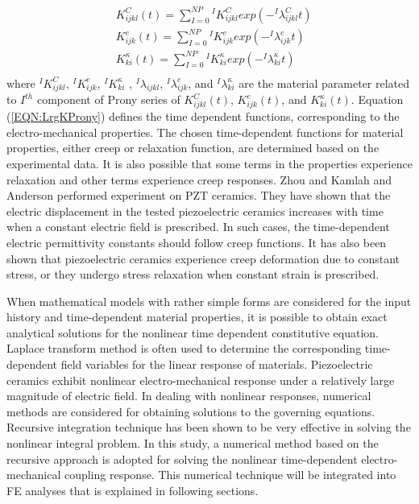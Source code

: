 \begin{equation}
\label{EQN:LrgKProny}
\begin{aligned}
&K_{ijkl}^C(t) =
\sum_{I=0}^{NP}{}^{I}K_{ijkl}^{C} exp(-{}^{I}\lambda_{ijkl}^{C}t) \\
&K_{ijk}^e(t) =
\sum_{I=0}^{NP} {}^{I}K_{ijk}^{e} exp(-{}^{I}\lambda_{ijk}^{e}t) \\
&K_{ki}^\kappa(t) =
\sum_{I=0}^{NP}  {}^{I}K_{ki}^{\kappa} exp(-{}^{I}\lambda_{ki}^{\kappa}t) \\
\end{aligned}
\end{equation}                   
where $ {}^{I}K_{ijkl}^{C} $, $ {}^{I}K_{ijk}^{e} $, $ {}^{I}K_{ki}^{\kappa} $ , $ {}^{I}\lambda_{ijkl} $, $ {}^{I}\lambda_{ijk}^{e} $, and $ {}^{I}\lambda_{ki}^{\kappa} $ are the material parameter related to $ I^{th} $ component of Prony series of $ K_{ijkl}^C(t) $, $ K_{ijk}^e(t) $, and  $ K_{ki}^\kappa(t) $.
Equation (\ref{EQN:LrgKProny}) defines the time dependent functions, corresponding to the electro-mechanical properties.
The chosen time-dependent functions for material properties, either creep or relaxation function, are determined based on the experimental data. 
It is also possible that some terms in the properties experience relaxation and other terms experience creep responses. 
Zhou and Kamlah \cite{zhoudetermination2005} and Anderson \cite{anderson1989piezoceramic} performed experiment on PZT ceramics.
They have shown that the electric displacement in the tested piezoelectric ceramics increases with time when a constant electric field is prescribed. 
In such cases, the time-dependent electric permittivity constants should follow creep functions. 
It has also been shown that piezoelectric ceramics experience creep deformation due to constant stress, or they undergo stress relaxation when constant strain is prescribed.

When mathematical models with rather simple forms are considered for the input history and time-dependent material properties,
it is possible to obtain exact analytical solutions for the nonlinear time dependent constitutive equation.
Laplace transform method \cite{Wineman2000} is often used to determine the corresponding time-dependent field variables for the linear response of materials. 
Piezoelectric ceramics exhibit nonlinear electro-mechanical response under a relatively large magnitude of electric field. 
In dealing with nonlinear responses, numerical methods are considered for obtaining solutions to the governing equations.
Recursive integration technique has been shown to be very effective in solving the nonlinear integral problem. 
In this study, a numerical method based on the recursive approach is adopted for solving the nonlinear time-dependent electro-mechanical coupling response.
This numerical technique will be integrated into FE analyses that is explained in following sections.

